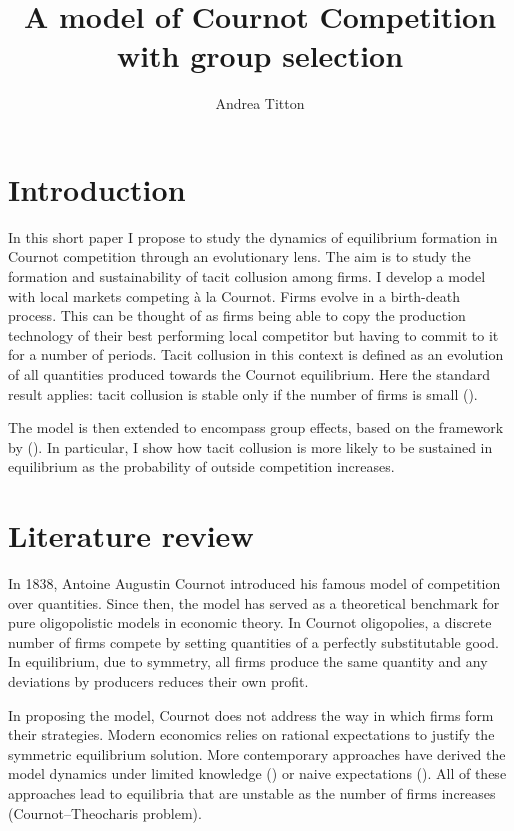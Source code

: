 \documentclass[american]{scrartcl}
\title{A model of Cournot Competition with group selection}
\author{Andrea Titton}
\newcommand{\citein}[1]{\citeauthor{#1} (\citeyear{#1})}
\begin{document}

\maketitle

\section{Introduction}



In this short paper I propose to study the dynamics of equilibrium formation in Cournot competition through an evolutionary lens. The aim is to study the formation and sustainability of tacit collusion among firms. I develop a model with local markets competing à la Cournot. Firms evolve in a birth-death process. This can be thought of as firms being able to copy the production technology of their best performing local competitor but having to commit to it for a number of periods. Tacit collusion in this context is defined as an evolution of all quantities produced towards the Cournot equilibrium. Here the standard result applies: tacit collusion is stable only if the number of firms is small (\cite{Lampart2012}).

The model is then extended to encompass group effects, based on the framework by \citein{Akdeniz2020}. In particular, I show how tacit collusion is more likely to be sustained in equilibrium as the probability of outside competition increases.

\section{Literature review}

In 1838, Antoine Augustin Cournot introduced his famous model of competition over quantities. Since then, the model has served as a theoretical benchmark for pure oligopolistic models in economic theory. In Cournot oligopolies, a discrete number of firms compete by setting quantities of a perfectly substitutable good. In equilibrium, due to symmetry, all firms produce the same quantity and any deviations by producers reduces their own profit.

In proposing the model, Cournot does not address the way in which firms form their strategies. Modern economics relies on rational expectations to justify the symmetric equilibrium solution. More contemporary approaches have derived the model dynamics under limited knowledge (\cite{Bischi2015}) or naive expectations (\cite{Cnovas2008}). All of these approaches lead to equilibria that are unstable as the number of firms increases (Cournot–Theocharis problem).
\end{document}
